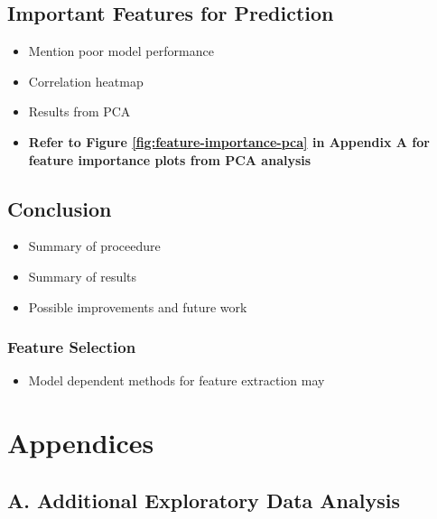 \documentclass[12pt,]{article}
\providecommand{\tightlist}{%
  \setlength{\itemsep}{0pt}\setlength{\parskip}{0pt}}
\begin{document}
\subsection{Important Features for
Prediction}\label{important-features-for-prediction}

\begin{itemize}
\tightlist
\item
  Mention poor model performance
\item
  Correlation heatmap
\item
  Results from PCA
\item
  \textbf{Refer to Figure \ref{fig:feature-importance-pca} in Appendix A
  for feature importance plots from PCA analysis}
\end{itemize}

\subsection{Conclusion}\label{conclusion}

\begin{itemize}
\tightlist
\item
  Summary of proceedure
\item
  Summary of results
\item
  Possible improvements and future work
\end{itemize}

\subsubsection{Feature Selection}\label{feature-selection-2}

\begin{itemize}
\tightlist
\item
  Model dependent methods for feature extraction may
\end{itemize}

\newpage

\section{Appendices}\label{appendices}

\subsection{A. Additional Exploratory Data
Analysis}\label{a.-additional-exploratory-data-analysis}
\end{document}
